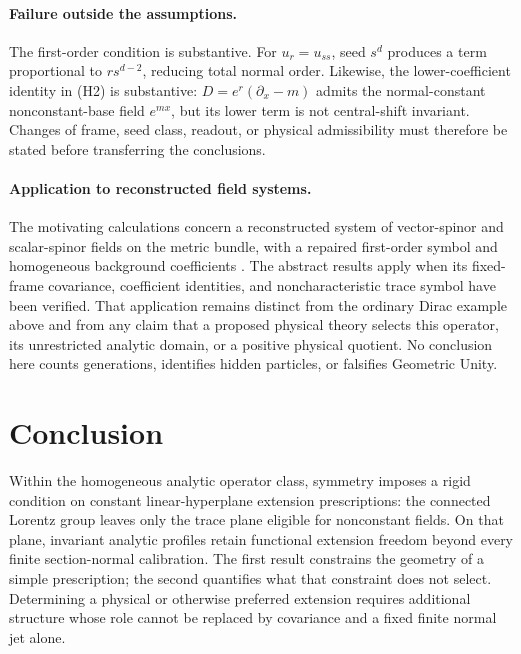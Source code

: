\documentclass[11pt]{article}
\theoremstyle{definition}\newtheorem{definition}[theorem]{Definition}
\theoremstyle{remark}\newtheorem{remark}[theorem]{Remark}
\begin{document}
\paragraph{Failure outside the assumptions.}
The first-order condition is substantive. For $u_r=u_{ss}$, seed $s^d$ produces a term proportional to $rs^{d-2}$, reducing total normal order. Likewise, the lower-coefficient identity in (H2) is substantive: $D=e^r(\partial_x-m)$ admits the normal-constant nonconstant-base field $e^{mx}$, but its lower term is not central-shift invariant. Changes of frame, seed class, readout, or physical admissibility must therefore be stated before transferring the conclusions.

\paragraph{Application to reconstructed field systems.}
The motivating calculations concern a reconstructed system of vector-spinor and scalar-spinor fields on the metric bundle, with a repaired first-order symbol and homogeneous background coefficients \cite{Repo}. The abstract results apply when its fixed-frame covariance, coefficient identities, and noncharacteristic trace symbol have been verified. That application remains distinct from the ordinary Dirac example above and from any claim that a proposed physical theory selects this operator, its unrestricted analytic domain, or a positive physical quotient. No conclusion here counts generations, identifies hidden particles, or falsifies Geometric Unity.

\section{Conclusion}
Within the homogeneous analytic operator class, symmetry imposes a rigid condition on constant linear-hyperplane extension prescriptions: the connected Lorentz group leaves only the trace plane eligible for nonconstant fields. On that plane, invariant analytic profiles retain functional extension freedom beyond every finite section-normal calibration. The first result constrains the geometry of a simple prescription; the second quantifies what that constraint does not select. Determining a physical or otherwise preferred extension requires additional structure whose role cannot be replaced by covariance and a fixed finite normal jet alone.

\appendix
\end{document}
